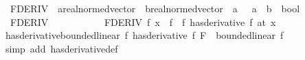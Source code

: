 \begin{isabellebody}
\ \ FDERIV\ {\isacharcolon}{\kern0pt}{\isacharcolon}{\kern0pt}\ {\isachardoublequoteopen}{\isacharparenleft}{\kern0pt}{\isacharprime}{\kern0pt}a{\isacharcolon}{\kern0pt}{\isacharcolon}{\kern0pt}real{\isacharunderscore}{\kern0pt}normed{\isacharunderscore}{\kern0pt}vector\ {\isasymRightarrow}\ {\isacharprime}{\kern0pt}b{\isacharcolon}{\kern0pt}{\isacharcolon}{\kern0pt}real{\isacharunderscore}{\kern0pt}normed{\isacharunderscore}{\kern0pt}vector{\isacharparenright}{\kern0pt}\ {\isasymRightarrow}\ {\isacharprime}{\kern0pt}a\ {\isasymRightarrow}\ \ {\isacharparenleft}{\kern0pt}{\isacharprime}{\kern0pt}a\ {\isasymRightarrow}\ {\isacharprime}{\kern0pt}b{\isacharparenright}{\kern0pt}\ {\isasymRightarrow}\ bool{\isachardoublequoteclose}\isanewline
\ \ {\isacharparenleft}{\kern0pt}{\isachardoublequoteopen}{\isacharparenleft}{\kern0pt}FDERIV\ {\isacharparenleft}{\kern0pt}{\isacharunderscore}{\kern0pt}{\isacharparenright}{\kern0pt}{\isacharslash}{\kern0pt}\ {\isacharparenleft}{\kern0pt}{\isacharunderscore}{\kern0pt}{\isacharparenright}{\kern0pt}{\isacharslash}{\kern0pt}\ {\isacharcolon}{\kern0pt}{\isachargreater}{\kern0pt}\ {\isacharparenleft}{\kern0pt}{\isacharunderscore}{\kern0pt}{\isacharparenright}{\kern0pt}{\isacharparenright}{\kern0pt}{\isachardoublequoteclose}\ {\isacharbrackleft}{\kern0pt}{}{}{}{}{\isacharcomma}{\kern0pt}\ {}{}{}{}{\isacharcomma}{\kern0pt}\ {}{}{\isacharbrackright}{\kern0pt}\ {}{}{\isacharparenright}{\kern0pt}\isanewline
\ \ \ {\isachardoublequoteopen}FDERIV\ f\ x\ {\isacharcolon}{\kern0pt}{\isachargreater}{\kern0pt}\ f{\isacharprime}{\kern0pt}\ {\isasymequiv}\ {\isacharparenleft}{\kern0pt}f\ has{\isacharunderscore}{\kern0pt}derivative\ f{\isacharprime}{\kern0pt}{\isacharparenright}{\kern0pt}\ {\isacharparenleft}{\kern0pt}at\ x{\isacharparenright}{\kern0pt}{\isachardoublequoteclose}\isanewline
\isanewline
{}\isamarkupfalse%
\ has{\isacharunderscore}{\kern0pt}derivative{\isacharunderscore}{\kern0pt}bounded{\isacharunderscore}{\kern0pt}linear{\isacharcolon}{\kern0pt}\ {\isachardoublequoteopen}{\isacharparenleft}{\kern0pt}f\ has{\isacharunderscore}{\kern0pt}derivative\ f{\isacharprime}{\kern0pt}{\isacharparenright}{\kern0pt}\ F\ {\isasymLongrightarrow}\ bounded{\isacharunderscore}{\kern0pt}linear\ f{\isacharprime}{\kern0pt}{\isachardoublequoteclose}\isanewline
%
\isadelimproof
\ \ %
\endisadelimproof
%
\isatagproof
{}\isamarkupfalse%
\ {\isacharparenleft}{\kern0pt}simp\ add{\isacharcolon}{\kern0pt}\ has{\isacharunderscore}{\kern0pt}derivative{\isacharunderscore}{\kern0pt}def{\isacharparenright}{\kern0pt}%

\end{isabellebody}
